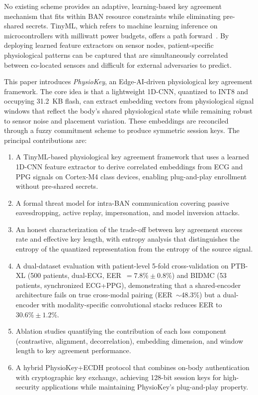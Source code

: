 \documentclass[sensors,article,submit,pdftex,moreauthors]{Definitions/mdpi}
\begin{document}
No existing scheme provides an adaptive, learning-based key agreement mechanism that fits within BAN resource constraints while eliminating pre-shared secrets. TinyML, which refers to machine learning inference on microcontrollers with milliwatt power budgets, offers a path forward~\cite{banbury2021mlperf, warden2019tinyml}. By deploying learned feature extractors on sensor nodes, patient-specific physiological patterns can be captured that are simultaneously correlated between co-located sensors and difficult for external adversaries to predict.

This paper introduces \textit{PhysioKey}, an Edge-AI-driven physiological key agreement framework. The core idea is that a lightweight 1D-CNN, quantized to INT8 and occupying 31.2~KB flash, can extract embedding vectors from physiological signal windows that reflect the body's shared physiological state while remaining robust to sensor noise and placement variation. These embeddings are reconciled through a fuzzy commitment scheme to produce symmetric session keys. The principal contributions are:

\begin{enumerate}
    \item A TinyML-based physiological key agreement framework that uses a learned 1D-CNN feature extractor to derive correlated embeddings from ECG and PPG signals on Cortex-M4 class devices, enabling plug-and-play enrollment without pre-shared secrets.

    \item A formal threat model for intra-BAN communication covering passive eavesdropping, active replay, impersonation, and model inversion attacks.

    \item An honest characterization of the trade-off between key agreement success rate and effective key length, with entropy analysis that distinguishes the entropy of the quantized representation from the entropy of the source signal.

    \item A dual-dataset evaluation with patient-level 5-fold cross-validation on PTB-XL (500 patients, dual-ECG, EER~$= 7.8\% \pm 0.8\%$) and BIDMC (53 patients, synchronized ECG+PPG), demonstrating that a shared-encoder architecture fails on true cross-modal pairing (EER~$\sim$48.3\%) but a dual-encoder with modality-specific convolutional stacks reduces EER to $30.6\% \pm 1.2\%$.

    \item Ablation studies quantifying the contribution of each loss component (contrastive, alignment, decorrelation), embedding dimension, and window length to key agreement performance.

    \item A hybrid PhysioKey+ECDH protocol that combines on-body authentication with cryptographic key exchange, achieving 128-bit session keys for high-security applications while maintaining PhysioKey's plug-and-play property.
\end{enumerate}
\end{document}
